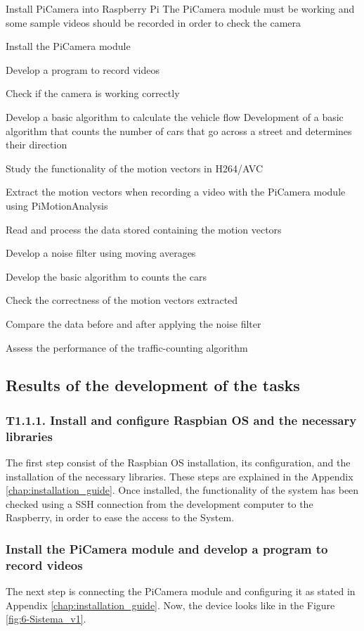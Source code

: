 {Install PiCamera into Raspberry Pi}
{The PiCamera module must be working and some sample videos should be recorded in order to check the camera}
{	\item Install the PiCamera module
	\item Develop a program to record videos
}{	\item Check if the camera is working correctly
}

{Develop a basic algorithm to calculate the vehicle flow}
{Development of a basic algorithm that counts the number of cars that go across a street and determines their direction}
{	\item Study the functionality of the motion vectors in H264/AVC
	\item Extract the motion vectors when recording a video with the PiCamera module using PiMotionAnalysis
	\item Read and process the data stored containing the motion vectors
	\item Develop a noise filter using moving averages
	\item Develop the basic algorithm to counts the cars
}{	\item Check the correctness of the motion vectors extracted
	\item Compare the data before and after applying the noise filter
	\item Assess the performance of the traffic-counting algorithm
}


\subsection{Results of the development of the tasks}
\subsubsection{T1.1.1. Install and configure Raspbian \ac{OS} and the necessary libraries}
The first step consist of the Raspbian \ac{OS} installation, its configuration, and the installation of the necessary libraries. These steps are explained in the Appendix \ref{chap:installation_guide}. Once installed, the functionality of the system has been checked using a SSH connection from the development computer to the Raspberry, in order to ease the access to the System. 

\subsubsection{Install the PiCamera module and develop a program to record videos}
The next step is connecting the PiCamera module and configuring it as stated in Appendix \ref{chap:installation_guide}. Now, the device looks like in the Figure \ref{fig:6-Sistema_v1}. 

